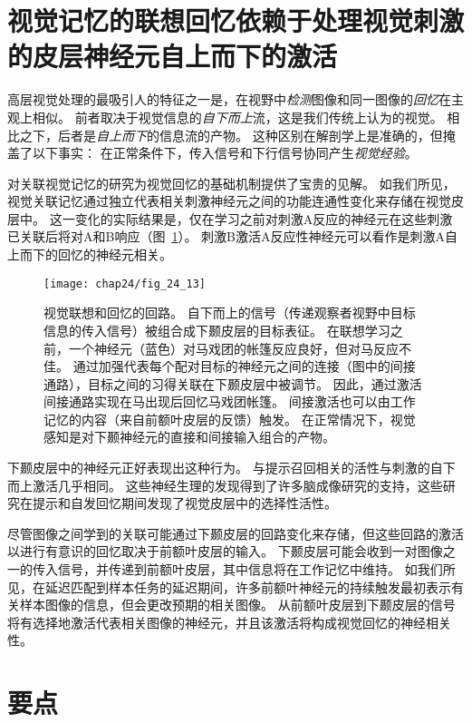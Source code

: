 \section{视觉记忆的联想回忆依赖于处理视觉刺激的皮层神经元自上而下的激活}

高层视觉处理的最吸引人的特征之一是，在视野中\textit{检测}图像和同一图像的\textit{回忆}在主观上相似。
前者取决于视觉信息的\textit{自下而上}流，这是我们传统上认为的视觉。
相比之下，后者是\textit{自上而下}的信息流的产物。
这种区别在解剖学上是准确的，但掩盖了以下事实：
在正常条件下，传入信号和下行信号协同产生\textit{视觉经验}。


对关联视觉记忆的研究为视觉回忆的基础机制提供了宝贵的见解。
如我们所见，视觉关联记忆通过独立代表相关刺激神经元之间的功能连通性变化来存储在视觉皮层中。
这一变化的实际结果是，仅在学习之前对刺激A反应的神经元在这些刺激已关联后将对A和B响应（图~\ref{fig:24_13}）。
刺激B激活A反应性神经元可以看作是刺激A自上而下的回忆的神经元相关。


\begin{figure}[htbp]
	\centering
	\texttt{[image: chap24/fig\_24\_13]}
	\caption{视觉联想和回忆的回路。
		自下而上的信号（传递观察者视野中目标信息的传入信号）被组合成下颞皮层的目标表征。
		在联想学习之前，一个神经元（蓝色）对马戏团的帐篷反应良好，但对马反应不佳。
		通过加强代表每个配对目标的神经元之间的连接（图中的间接通路），目标之间的习得关联在下颞皮层中被调节。
		因此，通过激活间接通路实现在马出现后回忆马戏团帐篷。
		间接激活也可以由工作记忆的内容（来自前额叶皮层的反馈）触发。
		在正常情况下，视觉感知是对下颞神经元的直接和间接输入组合的产物。}
	\label{fig:24_13}
\end{figure}


下颞皮层中的神经元正好表现出这种行为。
与提示召回相关的活性与刺激的自下而上激活几乎相同。
这些神经生理的发现得到了许多脑成像研究的支持，这些研究在提示和自发回忆期间发现了视觉皮层中的选择性活性。


尽管图像之间学到的关联可能通过下颞皮层的回路变化来存储，但这些回路的激活以进行有意识的回忆取决于前额叶皮层的输入。
下颞皮层可能会收到一对图像之一的传入信号，并传递到前额叶皮层，其中信息将在工作记忆中维持。
如我们所见，在延迟匹配到样本任务的延迟期间，许多前额叶神经元的持续触发最初表示有关样本图像的信息，但会更改预期的相关图像。
从前额叶皮层到下颞皮层的信号将有选择地激活代表相关图像的神经元，并且该激活将构成视觉回忆的神经相关性。



\section{要点}

